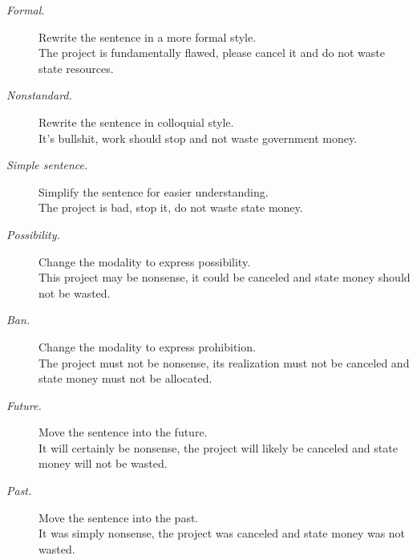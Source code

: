 \begin{description}
\item[\textit{Formal.}] Rewrite the sentence in a more formal style. \\
{The project is fundamentally flawed, please cancel it and do not waste state resources.}

\item[\textit{Nonstandard.}] Rewrite the sentence in colloquial style. \\
{It's bullshit, work should stop and not waste government money.}

\item[\textit{Simple sentence.}] Simplify the sentence for easier understanding. \\
{The project is bad, stop it, do not waste state money.}

\item[\textit{Possibility.}] Change the modality to express possibility. \\
{This project may be nonsense, it could be canceled and state money should not be wasted.}

\item[\textit{Ban.}] Change the modality to express prohibition. \\
{The project must not be nonsense, its realization must not be canceled and state money must not be allocated.}

\item[\textit{Future.}] Move the sentence into the future. \\
{It will certainly be nonsense, the project will likely be canceled and state money will not be wasted.}

\item[\textit{Past.}] Move the sentence into the past. \\
{It was simply nonsense, the project was canceled and state money was not wasted.}

\end{description}






